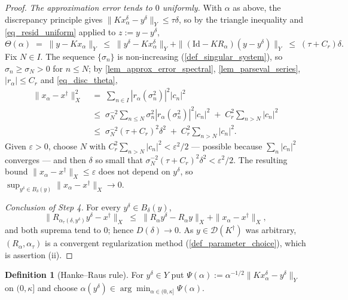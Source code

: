 \documentclass[a4paper]{report}
\theoremstyle{plain}
\theoremstyle{definition}
\newtheorem{definition}[theorem]{Definition}
\theoremstyle{remark}
\newcommand{\Dom}{\mathcal{D}}
\newcommand{\Id}{\mathrm{Id}}
\newcommand{\dg}{^{\dagger}}
\begin{document}
\begin{proof}
  \emph{The approximation error tends to $0$ uniformly.}  With $\alpha$ as above, the
  discrepancy principle gives $\|Kx^{\delta}_{\alpha} - y^{\delta}\|_Y \le \tau\delta$,
  so by the triangle inequality and \eqref{eq_resid_uniform} applied to $z := y -
  y^{\delta}$,
  \[
    \Theta(\alpha) \;=\; \|y - Kx_{\alpha}\|_Y \;\le\;
      \|y^{\delta} - Kx^{\delta}_{\alpha}\|_Y
      + \|(\Id - KR_{\alpha})(y - y^{\delta})\|_Y \;\le\; (\tau + C_r)\delta .
  \]
  Fix $N \in I$.  The sequence $\{\sigma_n\}$ is non-increasing
  (\cref{def_singular_system}), so $\sigma_n \ge \sigma_N > 0$ for $n \le N$; by
  \cref{lem_approx_error_spectral}, \cref{lem_parseval_series},
  $|r_{\alpha}| \le C_r$ and \eqref{eq_disc_theta},
  \[
    \begin{aligned}
      \|x_{\alpha} - x\dg\|_X^{2} &\;=\; \sum_{n \in I}|r_{\alpha}(\sigma_n^{2})|^{2}
        |c_n|^{2} \\
        &\;\le\; \sigma_N^{-2}\sum_{n \le N}\sigma_n^{2}|r_{\alpha}(\sigma_n^{2})|^{2}
          |c_n|^{2} \;+\; C_r^{2}\sum_{n > N}|c_n|^{2} \\
        &\;\le\; \sigma_N^{-2}(\tau + C_r)^{2}\delta^{2}
          \;+\; C_r^{2}\sum_{n > N}|c_n|^{2} .
    \end{aligned}
  \]
  Given $\varepsilon > 0$, choose $N$ with $C_r^{2}\sum_{n>N}|c_n|^{2} <
  \varepsilon^{2}/2$ --- possible because $\sum_n|c_n|^{2}$ converges --- and then
  $\delta$ so small that $\sigma_N^{-2}(\tau+C_r)^{2}\delta^{2} < \varepsilon^{2}/2$.
  The resulting bound $\|x_{\alpha} - x\dg\|_X \le \varepsilon$ does not depend on
  $y^{\delta}$, so $\sup_{y^{\delta} \in B_{\delta}(y)}\|x_{\alpha} - x\dg\|_X \to 0$.

  \emph{Conclusion of Step 4.}  For every $y^{\delta} \in B_{\delta}(y)$,
  \[
    \bigl\|R_{\alpha_{\tau}(\delta,y^{\delta})}y^{\delta} - x\dg\bigr\|_X
      \;\le\; \|R_{\alpha}y^{\delta} - R_{\alpha}y\|_X + \|x_{\alpha} - x\dg\|_X ,
  \]
  and both suprema tend to $0$; hence $D(\delta) \to 0$.  As $y \in \Dom(K\dg)$ was
  arbitrary, $(R_{\alpha},\alpha_{\tau})$ is a convergent regularization method
  (\cref{def_parameter_choice}), which is assertion (ii).
\end{proof}


\begin{definition}[Hanke--Raus rule]
  \label{def_hanke_raus}
  For $y^{\delta} \in Y$ put $\Psi(\alpha) := \alpha^{-1/2}\|Kx^{\delta}_{\alpha} -
  y^{\delta}\|_Y$ on $(0,\kappa]$ and choose $\alpha(y^{\delta}) \in
  \arg\min_{\alpha \in (0,\kappa]} \Psi(\alpha)$.
\end{definition}
\end{document}
